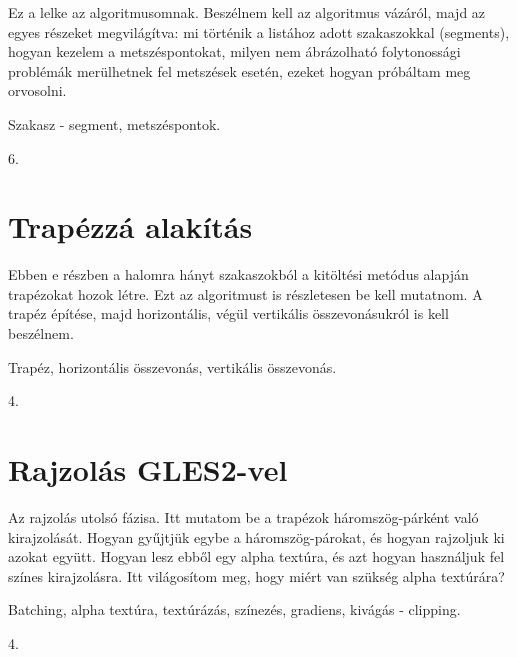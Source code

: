 \documentclass[12pt]{report}
\theoremstyle{definition}
\begin{document}
Ez a lelke az algoritmusomnak. Beszélnem kell az algoritmus vázáról, majd
az egyes részeket megvilágítva: mi történik a listához adott
szakaszokkal (segments), hogyan kezelem a metszéspontokat, milyen nem
ábrázolható folytonossági problémák merülhetnek fel metszések
esetén, ezeket hogyan próbáltam meg orvosolni.

  \begin{description}[noitemsep]
    \item[Kulcsszavak] Szakasz - segment, metszéspontok.
    \item[Becsült oldalszám] 6.
  \end{description}

  \section{Trapézzá alakítás}

Ebben e részben a halomra hányt szakaszokból a kitöltési metódus
alapján trapézokat hozok létre. Ezt az algoritmust is részletesen be kell
mutatnom. A trapéz építése, majd horizontális, végül vertikális
összevonásukról is kell beszélnem.

  \begin{description}[noitemsep]
    \item[Kulcsszavak] Trapéz, horizontális összevonás, vertikális összevonás.
    \item[Becsült oldalszám] 4.
  \end{description}

  \section{Rajzolás GLES2-vel}

Az rajzolás utolsó fázisa. Itt mutatom be a trapézok
háromszög-párként való kirajzolását. Hogyan gyűjtjük egybe a
háromszög-párokat, és hogyan rajzoljuk ki azokat együtt. Hogyan lesz
ebből egy alpha textúra, és azt hogyan használjuk fel színes
kirajzolásra. Itt világosítom meg, hogy miért van szükség alpha textúrára?

  \begin{description}[noitemsep]
    \item[Kulcsszavak] Batching, alpha textúra, textúrázás, színezés,
    gradiens, kivágás - clipping.
    \item[Becsült oldalszám] 4.
  \end{description}

\end{document}

